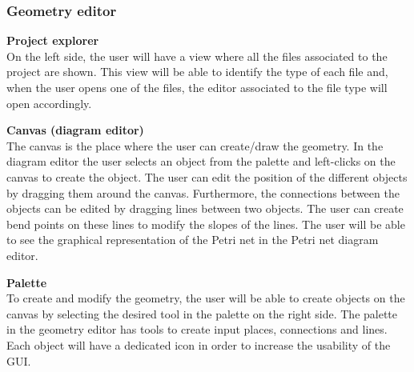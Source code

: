 \subsubsection{Geometry editor}
\textbf{Project explorer} \\
On the left side, the user will have a view where all the files associated to the project are shown. This view will be able to identify the type of each file and, when the user opens one of the files, the editor associated to the file type will open accordingly. 

\textbf{Canvas (diagram editor)} \\
The canvas is the place where the user can create/draw the geometry. In the diagram editor the user selects an object from the palette and left-clicks on the canvas to create the object. The user can edit the position of the different objects by dragging them around the canvas. Furthermore, the connections between the objects can be edited by dragging lines between two objects. The user can create bend points on these lines to modify the slopes of the lines. The user will be able to see the graphical representation of the Petri net in the Petri net diagram editor. 

\textbf{Palette} \\
To create and modify the geometry, the user will be able to create objects on the canvas by selecting the desired tool in the palette on the right side. The palette in the geometry editor has tools to create input places, connections and lines. Each object will have a dedicated icon in order to increase the usability of the GUI.

